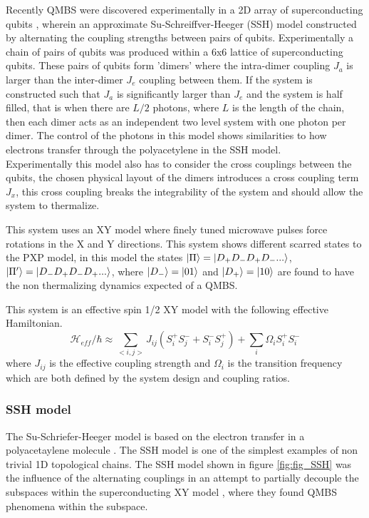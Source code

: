Recently QMBS were discovered experimentally in a 2D array of superconducting qubits \citep{zhang_many-body_2022}, wherein an approximate Su-Schreiffver-Heeger (SSH) model \cite{su_solitons_1979} constructed by alternating the coupling strengths between pairs of qubits. Experimentally a chain of pairs of qubits was produced within a 6x6 lattice of superconducting qubits. These pairs of qubits form 'dimers' where the intra-dimer coupling $J_a$ is larger than the inter-dimer $J_e$ coupling between them. If the system is constructed such that $J_a$ is significantly larger than $J_e$ and the system is half filled, that is when there are $L/2$ photons, where $L$ is the length of the chain, then each dimer acts as an independent two level system with one photon per dimer. The control of the photons in this model shows similarities to how electrons transfer through the polyacetylene in the SSH model. \\

Experimentally this model also has to consider the cross couplings between the qubits, the chosen physical layout of the dimers introduces a cross coupling term $J_x$, this cross coupling breaks the integrability of the system and should allow the system to thermalize.

This system uses an XY model where finely tuned microwave pulses force rotations in the X and Y directions. This system shows different scarred states to the PXP model, in this model the states $\ket{\Pi}=\ket{D_+D_-D_+D_-...}$, $\ket{\Pi '}=\ket{D_-D_+D_-D_+...}$, where $\ket{D_-} = \ket{01}$ and $ \ket{D_+}=\ket{10}$ are found to have the non thermalizing dynamics expected of a QMBS. 

This system is an effective spin 1/2 XY model with the following effective Hamiltonian. 
\begin{equation} \label{eq:eff_hamiltonian}
\mathcal{H}_{eff} /\hbar \approx \sum_{<i,j>}J_{ij} (S^+_iS^-_j + S^-_iS^+_j) +\sum_i \Omega_i S^+_iS_i^-
\end{equation}
where $J_{ij}$ is the effective coupling strength and $\Omega_i$ is the transition frequency which are both defined by the system design and coupling ratios. 


\subsubsection{SSH model}

The Su-Schriefer-Heeger model is based on the electron transfer in a polyacetaylene molecule \citep{su_solitons_1979}. The SSH model is one of the simplest examples of non trivial 1D topological chains. The SSH model shown in figure  \ref{fig:fig_SSH} was the influence of the alternating couplings in an attempt to partially decouple the subspaces within the superconducting XY model \citep{zhang_many-body_2022}, where they found QMBS phenomena within the subspace.

